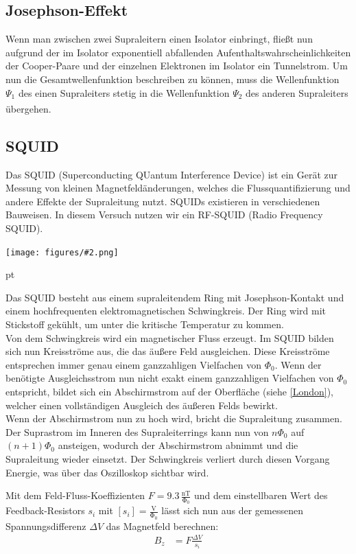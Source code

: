 \documentclass[12pt]{article}
\newcommand{\gra}[3][0.7]{
	\begin{minipage}[h!]{\textwidth}
		\centering
		\texttt{[image: figures/\#2.png]}
		\captionof{figure}{#3}
	\end{minipage}
	\vskip 30 pt
}
\begin{document}
\subsection{Josephson-Effekt}
Wenn man zwischen zwei Supraleitern einen Isolator einbringt, fließt nun aufgrund der im Isolator exponentiell abfallenden Aufenthaltswahrscheinlichkeiten der Cooper-Paare und der einzelnen Elektronen im Isolator ein Tunnelstrom. Um nun die Gesamtwellenfunktion beschreiben zu können, muss die Wellenfunktion $\Psi_1$ des einen Supraleiters stetig in die Wellenfunktion $\Psi_2$ des anderen Supraleiters übergehen. \textsuperscript{\cite{SQUID}}

\subsection{SQUID}
Das SQUID (Superconducting QUantum Interference Device) ist ein Gerät zur Messung von kleinen Magnetfeldänderungen, welches die Flussquantifizierung und andere Effekte der Supraleitung nutzt. SQUIDs existieren in verschiedenen Bauweisen. In diesem Versuch nutzen wir ein RF-SQUID (Radio Frequency SQUID).

\gra{squid}{Aufbau eines RF-SQUIDs}

Das SQUID besteht aus einem supraleitendem Ring mit Josephson-Kontakt und einem hochfrequenten elektromagnetischen Schwingkreis. Der Ring wird mit Stickstoff gekühlt, um unter die kritische Temperatur zu kommen.\\

Von dem Schwingkreis wird ein magnetischer Fluss erzeugt. Im SQUID bilden sich nun Kreisströme aus, die das äußere Feld ausgleichen. Diese Kreisströme entsprechen immer genau einem ganzzahligen Vielfachen von $\Phi_0$. Wenn der benötigte Ausgleichsstrom nun nicht exakt einem ganzzahligen Vielfachen von $\Phi_0$ entspricht, bildet sich ein Abschirmstrom auf der Oberfläche (siehe \ref{London}), welcher einen vollständigen Ausgleich des äußeren Felds bewirkt.\\

Wenn der Abschirmstrom nun zu hoch wird, bricht die Supraleitung zusammen. Der Suprastrom im Inneren des Supraleiterrings kann nun von $n\Phi_0$ auf $(n+1)\Phi_0$ ansteigen, wodurch der Abschirmstrom abnimmt und die Supraleitung wieder einsetzt. Der Schwingkreis verliert durch diesen Vorgang Energie, was über das Oszilloskop sichtbar wird.

Mit dem Feld-Fluss-Koeffizienten $F=9.3\,\mathrm{\frac{nT}{\Phi_0}}$ und dem einstellbaren Wert des Feedback-Resistors $s_i$ mit $[s_i]=\mathrm{\frac{V}{\Phi_0}}$ lässt sich nun aus der gemessenen Spannungsdifferenz $\Delta V$ das Magnetfeld berechnen:
\begin{align}
	B_z&=F\frac{\Delta V}{s_i}
\end{align}
\end{document}
